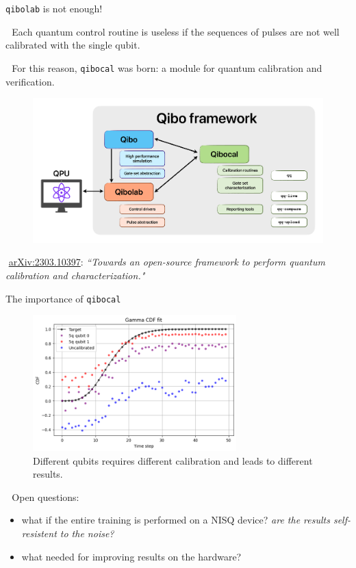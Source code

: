 \documentclass[9pt, xcolor={svgnames}, hyperref={colorlinks, linkcolor=black, citecolor=amethyst, urlcolor=amethyst}]{beamer}
\begin{document}
\begin{frame}{\texttt{qibolab} is not enough!}

\small

\faArrowCircleRight\,\, Each quantum control routine is useless if the sequences
of pulses are not well calibrated with the single qubit.
\pause

\faArrowCircleRight\,\, For this reason, \texttt{qibocal} was born: a module for
quantum calibration and verification.

    \begin{figure}  
    \includegraphics[width=1\textwidth]{figures/qibocal_in.png}
    \end{figure}
\pause

\footnotesize
\faBook\,\,\href{https://arxiv.org/abs/2303.10397}{arXiv:2303.10397}: \textit{``Towards an open-source framework to perform quantum calibration and characterization."}
\end{frame}


\begin{frame}{The importance of \texttt{qibocal}}
\small 
\begin{figure}  
\includegraphics[width=0.7\textwidth]{figures/cal_fit.png}
\caption{Different qubits requires different calibration and leads to different results.}
\end{figure}
\pause
\faArrowCircleRight\,\, Open questions:
\pause
\begin{itemize}[noitemsep]
\item[\faHandPointerO] what if the entire training is performed on a NISQ device? \textit{are
the results self-resistent to the noise?}
\pause
\item[\faHandPeaceO] what needed for improving results on the hardware? 
\end{itemize}
\end{frame}
\end{document}
